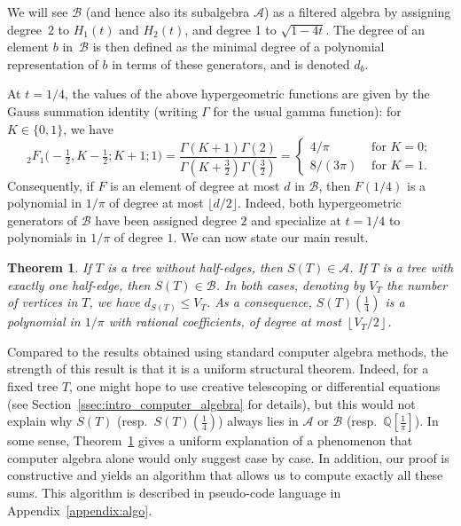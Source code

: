 \documentclass[12pt]{amsart}
\newcommand{\revision}[1]{{#1}}
\theoremstyle{plain}
\newtheorem{theorem}[lemma]{Theorem}
\theoremstyle{remark}
\def\cA{\mathcal{A}}
\def\cB{\mathcal{B}}
\begin{document}
We will see $\cB$ (and hence also its subalgebra $\cA$) as a filtered algebra by 
assigning degree~$2$ to $H_1(t)$ and $H_2(t)$,
and degree 1 to $\sqrt{1-4t}$.
The degree of an element $b$ in~$\cB$ is then defined as the minimal degree of a polynomial
representation of $b$ in terms of these generators, and is denoted $d_b$.

At $t=1/4$, the values of the above hypergeometric functions are given by the Gauss summation identity (writing $\Gamma$ for the usual gamma function): for $K \in \{0,1\}$, we have
\begin{equation} \label{eq:values_elliptic}
{}_{2}^{}{{}{{}{F_{1}^{}}}}\big(-\tfrac12,K-\tfrac12; K+1;1\big)
= \frac{\Gamma(K+1)\Gamma(2)}{\Gamma(K+\tfrac32) \Gamma(\tfrac32)}
= \begin{cases}
4/\pi & \text{ for }K=0;\\
8/(3\pi)  & \text{ for }K=1.
\end{cases}
\end{equation}
Consequently, if $F$ is an element \revision{of degree at most $d$} in $\cB$, then $F(1/4)$ is a polynomial in $1/\pi$ \revision{of degree at most $\lfloor d/2 \rfloor$}.
\revision{Indeed, both hypergeometric generators of $\cB$ have been assigned degree $2$ and specialize at $t=1/4$ to polynomials in $1/\pi$ of degree $1$.} 
We can now state our main result.
 \begin{theorem}\label{thm:sum-pi}
If $T$ is a tree without half-edges, then $S ( T ) \in \cA$.
%
If $T$ is a tree with exactly one half-edge, then $S ( T ) \in \cB$.
In both cases, denoting by $V_T$ the number of vertices in $T$, we have
$d_{S(T)} \leq V_T$.
As a consequence, $S ( T )(\frac{1}{4})$ is a polynomial in $1/\pi$
with rational coefficients, of degree at most $\left\lfloor {V_T}/{2} \right\rfloor$.
 \end{theorem}
\revision{Compared to the results obtained using standard computer algebra methods, the strength of this result is that it is a uniform structural theorem.  
Indeed, for a fixed tree $T$, one might hope to use creative telescoping or differential equations (see Section~\ref{ssec:intro_computer_algebra} for details), but this would not explain why $S(T)$ (resp.~$S ( T )(\frac{1}{4})$)
 always lies in $\cA$ or $\cB$ (resp.~$\mathbb Q[\tfrac1{\pi}]$). 
 In some sense, Theorem~\ref{thm:sum-pi} gives a uniform explanation of a phenomenon that computer algebra alone would only suggest case by case.}
In addition, \revision{our proof is constructive and yields} an algorithm that allows us to compute exactly all these sums.
This algorithm is described in pseudo-code language in Appendix~\ref{appendix:algo}.
\end{document}
